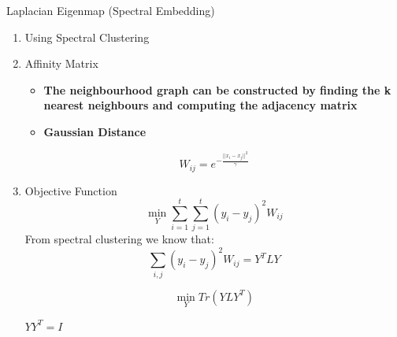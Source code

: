 \documentclass[10pt]{beamer}
\begin{document}
\begin{frame}{Laplacian Eigenmap (Spectral Embedding)}
	\begin{enumerate}
	\item 	Using Spectral Clustering 
    \item Affinity Matrix
    \begin{itemize}
    \item \textbf {The neighbourhood graph can be constructed by
finding the k nearest neighbours  and computing the adjacency matrix}
	\item \textbf{Gaussian Distance} 
    \end{itemize}

   \begin{equation}
W_{ij} = e{^{-\frac{||x_i - x_j|| ^ 2}{\gamma}}}
\end{equation} 

	\item Objective Function
    \begin{equation}
\min_{Y} \sum_{i = 1}^{t} \sum_{j = 1}^{t} (y_i - y_j)^2 W_{ij}
\end{equation}
 From spectral clustering we know that:
\begin{equation}
\sum_{i,j} (y_i - y_j)^2 W_{ij} = Y^T L Y 
\end{equation}

    \begin{equation}
	\min_{Y} Tr(YLY^T)  
	\end{equation}
    \begin{center}
  $YY^T = I$\\
\end{center}    
	\end{enumerate}
\end{frame}
\end{document}
